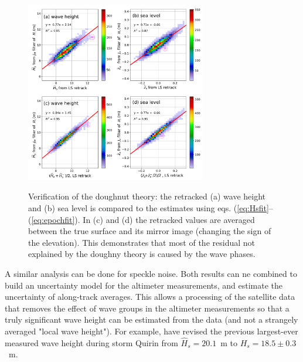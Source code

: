\begin{figure}[h!]
\centerline{\includegraphics[width=0.7\textwidth]{FIGS_CH_SAT/verification-of-the-altimeter-doughnut-footprint-theory.png}}
  \caption{Verification of the doughnut theory: the retracked (a) wave height and (b) sea level is compared to the estimates using eqs. (\ref{eq:Hsfit}--(\ref{eq:epochfit}). In (c) and (d) the retracked values are averaged between the true surface and its mirror image (changing the sign of the elevation). This demonstrates that most of the residual not explained by the doughny theory is caused by the wave phases.}{} \label{fig:alti_doughnut2}
\end{figure}

A similar analysis can be done for speckle noise.  Both results can ne combined to build an uncertainty model for the altimeter measurements, and estimate the uncertainty of along-track averages. This allows a processing of the satellite data that removes the effect of wave groups in the altimeter measurements so that a truly significant wave height can be estimated from the data (and not a strangely averaged "local wave height"). For example, \cite{DeCarlo&Ardhuin2024} have revised the previous largest-ever measured wave height during storm Quirin from $\widehat{H}_s=20.1$~m \citep{Hanafin&al.2012} to $H_s=18.5 \pm 0.3$~m.

